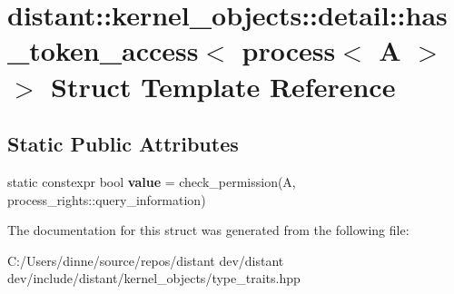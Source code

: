 \hypertarget{structdistant_1_1kernel__objects_1_1detail_1_1has__token__access_3_01process_3_01_a_01_4_01_4}{}\section{distant\+:\+:kernel\+\_\+objects\+:\+:detail\+:\+:has\+\_\+token\+\_\+access$<$ process$<$ A $>$ $>$ Struct Template Reference}
\label{structdistant_1_1kernel__objects_1_1detail_1_1has__token__access_3_01process_3_01_a_01_4_01_4}
\subsection*{Static Public Attributes}
\begin{DoxyCompactItemize}
\item 
\mbox{\label{structdistant_1_1kernel__objects_1_1detail_1_1has__token__access_3_01process_3_01_a_01_4_01_4_a8e5a5e4e0c4e6b3d2786f89ea293812b}} 
static constexpr bool {\bfseries value} = check\+\_\+permission(A, process\+\_\+rights\+::query\+\_\+information)
\end{DoxyCompactItemize}


The documentation for this struct was generated from the following file\+:\begin{DoxyCompactItemize}
\item 
C\+:/\+Users/dinne/source/repos/distant dev/distant dev/include/distant/kernel\+\_\+objects/type\+\_\+traits.\+hpp\end{DoxyCompactItemize}

